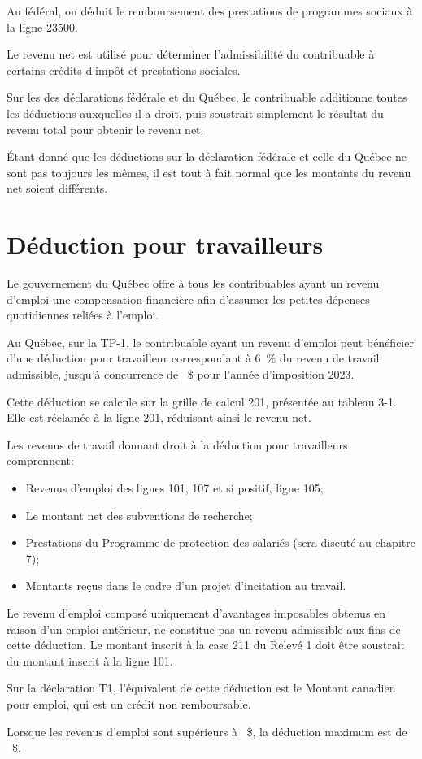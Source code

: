 Au fédéral, on déduit le remboursement des prestations de programmes sociaux à la ligne 23500.

Le revenu net est utilisé pour déterminer l'admissibilité du contribuable à certains crédits d'impôt et prestations sociales.

\begin{note}
	Sur les des déclarations fédérale et du Québec, le contribuable additionne toutes les déductions auxquelles il a droit, puis soustrait simplement le résultat du revenu total pour obtenir le revenu net.
	
	Étant donné que les déductions sur la déclaration fédérale et celle du Québec ne sont pas toujours les mêmes, il est tout à fait normal que les montants du revenu net soient différents.
\end{note}



\section{Déduction pour travailleurs}
\begin{intro}
	Le gouvernement du Québec offre à tous les contribuables ayant un revenu d'emploi une compensation financière afin d'assumer les petites dépenses quotidiennes reliées à l'emploi.
\end{intro}

Au Québec, sur la TP-1, le contribuable ayant un revenu d'emploi peut bénéficier d'une déduction pour travailleur correspondant à 6~\% du revenu de travail admissible, jusqu'à concurrence de ~\$ pour l'année d'imposition 2023. 

Cette déduction se calcule sur la grille de calcul 201, présentée au tableau 3-1. Elle est réclamée à la ligne 201, réduisant ainsi le revenu net.

Les revenus de travail donnant droit à la déduction pour travailleurs comprennent:
\begin{itemize}
	\item Revenus d'emploi des lignes 101, 107 et si positif, ligne 105;
	\item Le montant net des subventions de recherche;
	\item Prestations du Programme de protection des salariés (sera discuté au chapitre 7);
	\item Montants reçus dans le cadre d'un projet d'incitation au travail.
\end{itemize}
\begin{note}
	Le revenu d'emploi composé uniquement d'avantages imposables obtenus en raison d'un emploi antérieur, ne constitue pas un revenu admissible aux fins de cette déduction. Le montant inscrit à la case 211 du Relevé 1 doit être soustrait du montant inscrit à la ligne 101.
\end{note}
Sur la déclaration T1, l'équivalent de cette déduction est le Montant canadien pour emploi, qui est un crédit non remboursable.
\begin{note}
	Lorsque les revenus d'emploi sont supérieurs à ~\$, la déduction maximum est de ~\$.
\end{note}



